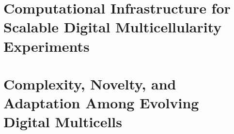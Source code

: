 

\part{Computational Infrastructure for Scalable Digital Multicellularity Experiments} \label{part:infrastructure}





\part{Complexity, Novelty, and Adaptation Among Evolving Digital Multicells} \label{part:experiments}





